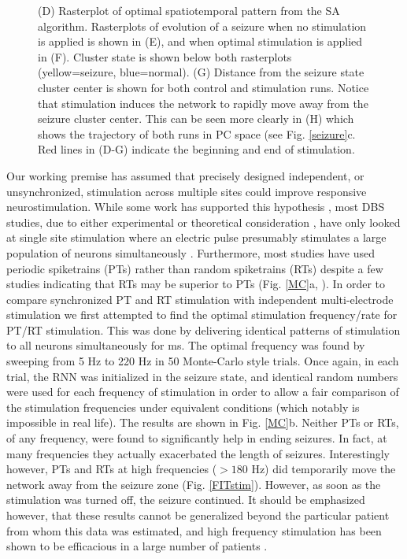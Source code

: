\documentclass[11pt,a4paper,final]{article}
\begin{document}
\begin{figure}[!ht]
{		(D) Rasterplot of optimal spatiotemporal pattern from the SA algorithm.
		Rasterplots of evolution of a seizure when no stimulation is applied is shown in (E), and when optimal stimulation is applied in (F). Cluster state is shown below both rasterplots (yellow=seizure, blue=normal).
		(G) Distance from the seizure state cluster center is shown for both control and stimulation runs. Notice that stimulation induces the network to rapidly move away from the seizure cluster center. This can be seen more clearly in (H) which shows the trajectory of both runs in PC space (see Fig. \ref{seizure}c.
		Red lines in (D-G) indicate the beginning and end of stimulation.}
	\label{SAresults}
\end{figure}

Our working premise has assumed that precisely designed independent, or unsynchronized, stimulation across multiple sites could improve responsive neurostimulation.
While some work has supported this hypothesis \citep{nelson11}, most DBS studies, due to either experimental or theoretical consideration \citep{durand01}, have only looked at single site stimulation where an electric pulse presumably stimulates a large population of neurons simultaneously \citep{sun14}.
Furthermore, most studies have used periodic spiketrains (PTs) rather than random spiketrains (RTs) despite a few studies indicating that RTs may be superior to PTs (Fig. \ref{MC}a, \citet{wyckhuys10,van14}).
In order to compare synchronized PT and RT stimulation with independent multi-electrode stimulation we first attempted to find the optimal stimulation frequency/rate for PT/RT stimulation.
This was done by delivering identical patterns of stimulation to all \nn{} neurons simultaneously for \len{} ms.
The optimal frequency was found by sweeping from 5 Hz to 220 Hz in 50 Monte-Carlo style trials.
Once again, in each trial, the RNN was initialized in the seizure state, and identical random numbers were used for each frequency of stimulation in order to allow a fair comparison of the stimulation frequencies under equivalent conditions (which notably is impossible in real life).
The results are shown in Fig. \ref{MC}b.
Neither PTs or RTs, of any frequency, were found to significantly help in ending seizures.
In fact, at many frequencies they actually exacerbated the length of seizures.
Interestingly however, PTs and RTs at high frequencies ($>180$ Hz) did temporarily move the network away from the seizure zone (Fig. \ref{FITstim}).
However, as soon as the stimulation was turned off, the seizure continued.
It should be emphasized however, that these results cannot be generalized beyond the particular patient from whom this data was estimated, and high frequency stimulation has been shown to be efficacious in a large number of patients \citep{heck14}.
\end{document}
